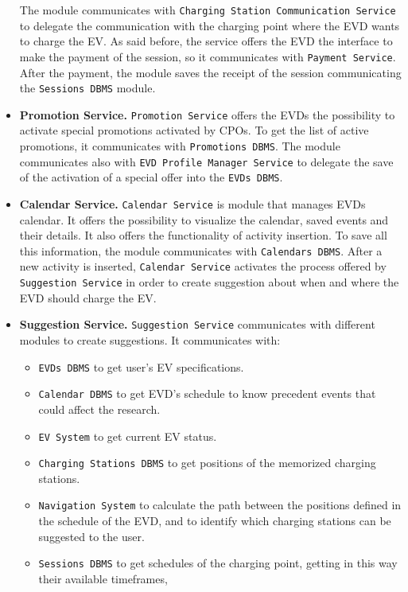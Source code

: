 \begin{itemize}
    The module communicates with \verb|Charging Station Communication Service| to delegate the communication with the charging point
    where the EVD wants to charge the EV\@.
    As said before, the service offers the EVD the interface to make the payment of the session, so it communicates with
    \verb|Payment Service|.
    After the payment, the module saves the receipt of the session communicating the \verb|Sessions DBMS| module.
    \item \textbf{Promotion Service.} \verb|Promotion Service| offers the EVDs the possibility to activate special promotions
    activated by CPOs.
    To get the list of active promotions, it communicates with \verb|Promotions DBMS|.
    The module communicates also with \verb|EVD Profile Manager Service| to delegate the save of the activation of a special offer into
    the \verb|EVDs DBMS|.
    \item \textbf{Calendar Service.} \verb|Calendar Service| is module that manages EVDs calendar.
    It offers the possibility to visualize the calendar, saved events and their details.
    It also offers the functionality of activity insertion.
    To save all this information, the module communicates with \verb|Calendars DBMS|.
    After a new activity is inserted, \verb|Calendar Service| activates the process offered by \verb|Suggestion Service|
    in order to create suggestion about when and where the EVD should charge the EV\@.
    \item \textbf{Suggestion Service.} \verb|Suggestion Service| communicates with different modules to create suggestions.
    It communicates with:
    \begin{itemize}
        \item \verb|EVDs DBMS| to get user's EV specifications.
        \item \verb|Calendar DBMS| to get EVD's schedule to know precedent events that could affect the research.
        \item \verb|EV System| to get current EV status.
        \item \verb|Charging Stations DBMS| to get positions of the memorized charging stations.
        \item \verb|Navigation System| to calculate the path between the positions defined in the schedule of the EVD,
        and to identify which charging stations can be suggested to the user.
        \item \verb|Sessions DBMS| to get schedules of the charging point, getting in this way their available timeframes,

\end{itemize}
\end{itemize}
